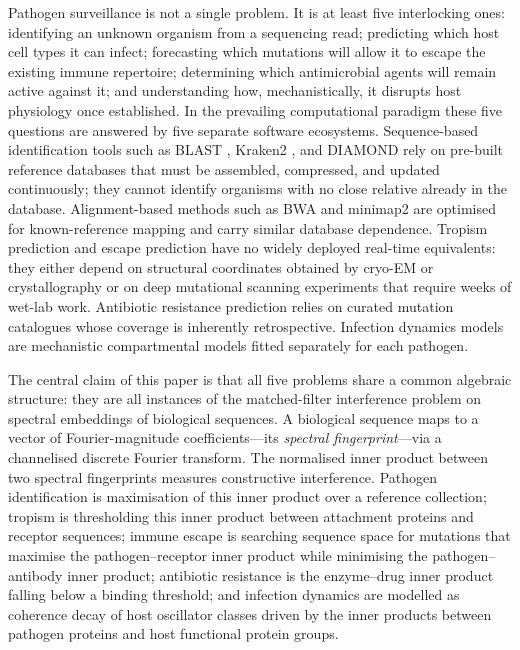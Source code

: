 Pathogen surveillance is not a single problem. It is at least five interlocking
ones: identifying an unknown organism from a sequencing read; predicting which
host cell types it can infect; forecasting which mutations will allow it to
escape the existing immune repertoire; determining which antimicrobial agents
will remain active against it; and understanding how, mechanistically, it
disrupts host physiology once established. In the prevailing computational
paradigm these five questions are answered by five separate software ecosystems.
Sequence-based identification tools such as BLAST \citep{altschul1990,
altschul1997}, Kraken2 \citep{wood2019}, and DIAMOND \citep{buchfink2015}
rely on pre-built reference databases that must be assembled, compressed, and
updated continuously; they cannot identify organisms with no close relative
already in the database. Alignment-based methods such as BWA \citep{li2009}
and minimap2 \citep{li2018} are optimised for known-reference mapping and carry
similar database dependence. Tropism prediction and escape prediction have no
widely deployed real-time equivalents: they either depend on structural
coordinates obtained by cryo-EM or crystallography \citep{lan2020, hoffmann2020}
or on deep mutational scanning experiments \citep{bloom2014} that require weeks
of wet-lab work. Antibiotic resistance prediction relies on curated mutation
catalogues whose coverage is inherently retrospective. Infection dynamics models
are mechanistic compartmental models fitted separately for each pathogen.

The central claim of this paper is that all five problems share a common
algebraic structure: they are all instances of the matched-filter interference
problem on spectral embeddings of biological sequences. A biological sequence
maps to a vector of Fourier-magnitude coefficients---its \emph{spectral
fingerprint}---via a channelised discrete Fourier transform. The normalised
inner product between two spectral fingerprints measures constructive
interference. Pathogen identification is maximisation of this inner product
over a reference collection; tropism is thresholding this inner product between
attachment proteins and receptor sequences; immune escape is searching sequence
space for mutations that maximise the pathogen--receptor inner product while
minimising the pathogen--antibody inner product; antibiotic resistance is the
enzyme--drug inner product falling below a binding threshold; and infection
dynamics are modelled as coherence decay of host oscillator classes driven by
the inner products between pathogen proteins and host functional protein groups.

